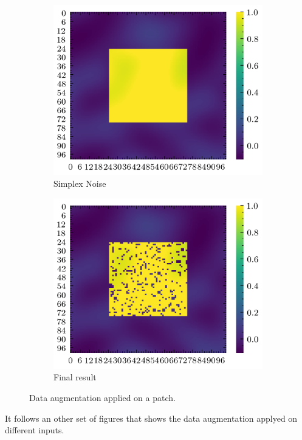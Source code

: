 \documentclass[../document.tex]{subfiles}
\begin{document}
\begin{figure}[H]
          \begin{subfigure}[b]{0.32\textwidth}
            \includegraphics[width=\textwidth]{../img/data-aug/2d/center-simplex.png}
            \caption{Simplex Noise}

        \end{subfigure}    
        \begin{subfigure}[b]{0.32\textwidth}
            \includegraphics[width=\textwidth]{../img/data-aug/2d/center-aug.png}
            \caption{Final result}
        \end{subfigure}    
    \label{fig: square-patch-aug}
    \caption{Data augmentation applied on a patch.}    
\end{figure}
It follows an other set of figures that shows the data augmentation applyed on different inputs.
\end{document}
